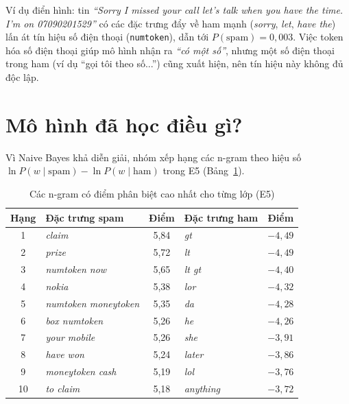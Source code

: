 Ví dụ điển hình: tin \textit{``Sorry I missed your call let's talk when you have the time. I'm on 07090201529''} có các đặc trưng đẩy về ham mạnh (\textit{sorry}, \textit{let}, \textit{have the}) lấn át tín hiệu số điện thoại (\texttt{numtoken}), dẫn tới $P(\text{spam})=0{,}003$. Việc token hóa số điện thoại giúp mô hình nhận ra \textit{``có một số''}, nhưng một số điện thoại trong ham (ví dụ ``gọi tôi theo số...'') cũng xuất hiện, nên tín hiệu này không đủ độc lập.

\section{Mô hình đã học điều gì?}

Vì Naive Bayes khả diễn giải, nhóm xếp hạng các n-gram theo hiệu số $\ln P(w\mid\text{spam})-\ln P(w\mid\text{ham})$ trong E5 (Bảng~\ref{tab:top-words}).

\begin{table}[H]
\centering
\caption{Các n-gram có điểm phân biệt cao nhất cho từng lớp (E5)}
\label{tab:top-words}
\small
\begin{tabular}{|c|p{3.6cm}|c|p{3.2cm}|c|}
\hline
\textbf{Hạng} & \textbf{Đặc trưng spam} & \textbf{Điểm} & \textbf{Đặc trưng ham} & \textbf{Điểm} \\
\hline
1 & \textit{claim} & 5,84 & \textit{gt} & $-4,49$ \\
\hline
2 & \textit{prize} & 5,72 & \textit{lt} & $-4,49$ \\
\hline
3 & \textit{numtoken now} & 5,65 & \textit{lt gt} & $-4,40$ \\
\hline
4 & \textit{nokia} & 5,38 & \textit{lor} & $-4,32$ \\
\hline
5 & \textit{numtoken moneytoken} & 5,35 & \textit{da} & $-4,28$ \\
\hline
6 & \textit{box numtoken} & 5,26 & \textit{he} & $-4,26$ \\
\hline
7 & \textit{your mobile} & 5,26 & \textit{she} & $-3,91$ \\
\hline
8 & \textit{have won} & 5,24 & \textit{later} & $-3,86$ \\
\hline
9 & \textit{moneytoken cash} & 5,19 & \textit{lol} & $-3,76$ \\
\hline
10 & \textit{to claim} & 5,18 & \textit{anything} & $-3,72$ \\
\hline
\end{tabular}
\end{table}

